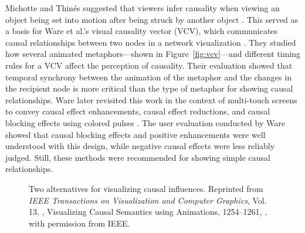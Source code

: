 Michotte and Thin\'es suggested that viewers infer causality when viewing an object being set into motion after being struck by another object \citeyearpar{michotte1963}.  This served as a basis for Ware et al.'s visual causality vector (VCV), which communicates causal relationships between two nodes in a network visualization \citeyearpar{ware1999}.  They studied how several animated metaphors---shown in Figure~\ref{fig:vcv}---and different timing rules for a VCV affect the perception of causality.  Their evaluation showed that temporal synchrony between the animation of the metaphor and the changes in the recipient node is more critical than the type of metaphor for showing causal relationships.  Ware later revisited this work in the context of multi-touch screens to convey causal effect enhancements, causal effect reductions, and causal blocking effects using colored pulses \citeyearpar{ware2013}.  The user evaluation conducted by Ware showed that causal blocking effects and positive enhancements were well understood with this design, while negative causal effects were less reliably judged.  Still, these methods were recommended for showing simple causal relationships.

\begin{figure}
\centering
{} 

\caption[Two alternatives for visualizing causal influences]{Two alternatives for visualizing causal influences.  Reprinted from \textit{IEEE Transactions on Visualization and Computer Graphics}, Vol. 13, \citeauthor{kadaba2007}, Visualizing Causal Semantics using Animations, 1254--1261, \textcopyright \citeyear{kadaba2007}, with permission from IEEE.}

	\label{fig:kadaba}
\end{figure}

